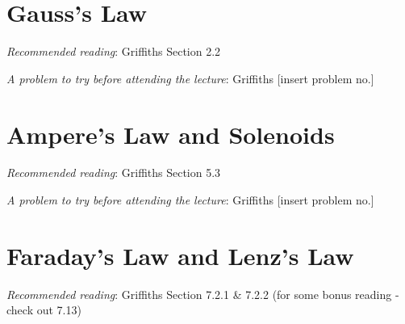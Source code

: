 \documentclass[
  letterpaper,
  DIV=11,
  numbers=noendperiod]{scrreprt}
\begin{document}

\chapter{Gauss's Law}\label{gausss-law}

\newcommand{\l}{\mathrm{\mathbf{l}}}
\newcommand{\E}{\mathrm{\mathbf{E}}}
\newcommand{\F}{\mathrm{\mathbf{F}}}
\newcommand{\r}{\mathrm{\mathbf{r}}}

\newcommand{\x}{\mathrm{\mathbf{x}}}
\newcommand{\y}{\mathrm{\mathbf{y}}}
\newcommand{\z}{\mathrm{\mathbf{z}}}

\emph{Recommended reading}: Griffiths Section 2.2

\emph{A problem to try before attending the lecture}: Griffiths
{[}insert problem no.{]}


\chapter{Ampere's Law and Solenoids}\label{amperes-law-and-solenoids}

\newcommand{\l}{\mathrm{\mathbf{l}}}
\newcommand{\E}{\mathrm{\mathbf{E}}}
\newcommand{\F}{\mathrm{\mathbf{F}}}
\newcommand{\r}{\mathrm{\mathbf{r}}}

\newcommand{\x}{\mathrm{\mathbf{x}}}
\newcommand{\y}{\mathrm{\mathbf{y}}}
\newcommand{\z}{\mathrm{\mathbf{z}}}

\emph{Recommended reading}: Griffiths Section 5.3

\emph{A problem to try before attending the lecture}: Griffiths
{[}insert problem no.{]}


\chapter{Faraday's Law and Lenz's Law}\label{faradays-law-and-lenzs-law}

\newcommand{\l}{\mathrm{\mathbf{l}}}
\newcommand{\E}{\mathrm{\mathbf{E}}}
\newcommand{\F}{\mathrm{\mathbf{F}}}
\newcommand{\r}{\mathrm{\mathbf{r}}}

\newcommand{\x}{\mathrm{\mathbf{x}}}
\newcommand{\y}{\mathrm{\mathbf{y}}}
\newcommand{\z}{\mathrm{\mathbf{z}}}

\emph{Recommended reading}: Griffiths Section 7.2.1 \& 7.2.2 (for some
bonus reading - check out 7.13)
\end{document}
